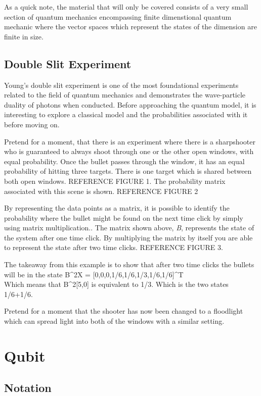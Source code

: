 \documentclass[12pt]{article}
\begin{document}
As a quick note, the material that will only be covered consists of a very small section of quantum mechanics encompassing finite dimenstional quantum mechanic where the vector spaces which represent the states of the dimension are finite in size.\par

\subsection{Double Slit Experiment}
Young's double slit experiment is one of the most foundational experiments related to the field of quantum mechanics and demonstrates the wave-particle duality of photons when conducted. Before approaching the quantum model, it is interesting to explore a classical model and the probabilities associated with it before moving on.\par
Pretend for a moment, that there is an experiment where there is a sharpshooter who is guaranteed to always shoot through one or the other open windows, with equal probability. Once the bullet passes through the window, it has an equal probability of hitting three targets. There is one target which is shared between both open windows. REFERENCE FIGURE 1. The probability matrix associated with this scene is shown. REFERENCE FIGURE 2 \par
By representing the data points as a matrix, it is possible to identify the probability where the bullet might be found on the next time click by simply using matrix multiplication.\cite{intro}. The matrix shown above, \textit{B}, represents the state of the system after one time click. By multiplying the matrix by itself you are able to represent the state after two time clicks. REFERENCE FIGURE 3.\par
The takeaway from this example is to show that after two time clicks the bullets will be in the state B^2X = [0,0,0,1/6,1/6,1/3,1/6,1/6]^T\\
Which means that B^2[5,0] is equivalent to 1/3. Which is the two states 1/6+1/6.\par

Pretend for a moment that the shooter has now been changed to a floodlight which can spread light into both of the windows with a similar setting.

\section{Qubit}
\subsection{Notation}
\end{document}
